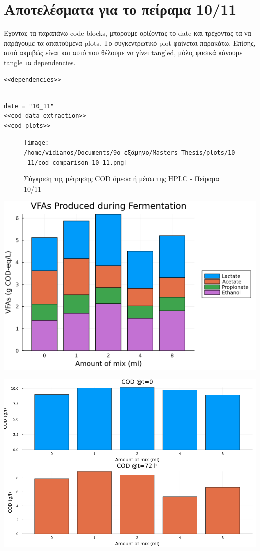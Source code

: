 \documentclass[11pt]{article}
\begin{document}
\section{Αποτελέσματα για το πείραμα 10/11}
\label{sec:org18b2cb3}
Έχοντας τα παραπάνω code blocks, μπορούμε ορίζοντας το date και τρέχοντας τα να παράγουμε τα απαιτούμενα plots. Το συγκεντρωτικό plot φαίνεται παρακάτω. Επίσης, αυτό ακριβώς είναι και αυτό που θέλουμε να γίνει tangled, μόλις φυσικά κάνουμε tangle τα dependencies.

\begin{verbatim}
<<dependencies>>
\end{verbatim}

\begin{verbatim}

date = "10_11"
<<cod_data_extraction>>
<<cod_plots>>

\end{verbatim}

\begin{figure}[htbp]
\centering
\texttt{[image: /home/vidianos/Documents/9o\_εξάμηνο/Masters\_Thesis/plots/10\_11/cod\_comparison\_10\_11.png]}
\caption{Σύγκριση της μέτρησης COD άμεσα ή μέσω της HPLC - Πείραμα 10/11}
\end{figure}

\begin{center}
\includegraphics[width=.9\linewidth]{../plots/10_11/vfa_cod_stackedbar_10_11.png}
\end{center}

\begin{center}
\includegraphics[width=.9\linewidth]{../plots/10_11/cod_bar_10_11.png}
\end{center}
\end{document}
